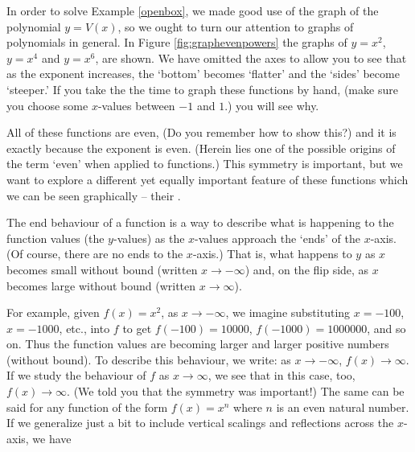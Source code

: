 \medskip

In order to solve Example \ref{openbox}, we made good use of the graph of the polynomial $y=V(x)$, so we ought to turn our attention to graphs of polynomials in general.  In Figure \ref{fig:graphevenpowers} the graphs of $y=x^2$, $y=x^4$ and $y=x^6$, are shown.  We have omitted the axes to allow you to see that as the exponent increases, the `bottom' becomes `flatter' and the `sides' become `steeper.'  If you take the the time to graph these functions by hand, (make sure you choose some $x$-values between $-1$ and $1$.) you will see why. 

All of these functions are even, (Do you remember how to show this?) and it is exactly because the exponent is even. (Herein lies one of the possible origins of the term `even' when applied to functions.) This symmetry is important, but we want to explore a different yet equally important feature of these functions which we can be seen graphically -- their .  

\smallskip

The end behaviour of a function is a way to describe what is happening to the function values (the $y$-values) as the $x$-values approach the `ends' of the $x$-axis. (Of course, there are no ends to the $x$-axis.) That is, what happens to $y$ as $x$ becomes small without bound (written $x \rightarrow -\infty$) and, on the flip side, as $x$ becomes large without bound (written $x \rightarrow \infty$).  




\smallskip

For example, given $f(x) = x^2$, as $x \rightarrow -\infty$, we imagine substituting $x=-100$, $x=-1000$, etc., into $f$ to get $f(-100)=10000$, $f(-1000)=1000000$, and so on. Thus  the function values are becoming larger and larger positive numbers (without bound).  To describe this behaviour, we write: as $x \rightarrow -\infty$, $f(x) \rightarrow \infty$.  If we study the behaviour of $f$ as $x \rightarrow \infty$, we see that in this case, too, $f(x) \rightarrow \infty$. (We told you that the symmetry was important!) The same can be said for any function of the form $f(x) = x^n$ where $n$ is an even natural number.   If we generalize just a bit to include vertical scalings and reflections across the $x$-axis,  we have

